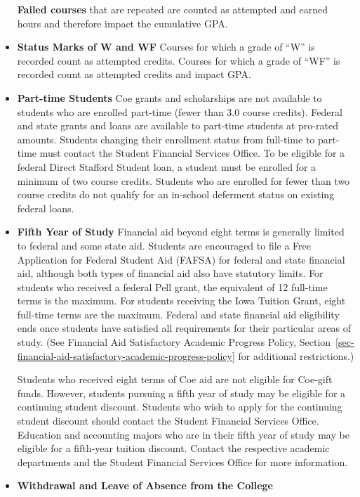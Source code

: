 \documentclass[
  letterpaper,
]{scrbook}
\begin{document}
\begin{itemize}
  \textbf{Failed courses} that are repeated are counted as attempted and
  earned hours and therefore impact the cumulative GPA.
\item
  \textbf{Status Marks of W and WF} Courses for which a grade of ``W''
  is recorded count as attempted credits. Courses for which a grade of
  ``WF'' is recorded count as attempted credits and impact GPA.
\item
  \textbf{Part-time Students} Coe grants and scholarships are not
  available to students who are enrolled part-time (fewer than 3.0
  course credits). Federal and state grants and loans are available to
  part-time students at pro-rated amounts. Students changing their
  enrollment status from full-time to part-time must contact the Student
  Financial Services Office. To be eligible for a federal Direct
  Stafford Student loan, a student must be enrolled for a minimum of two
  course credits. Students who are enrolled for fewer than two course
  credits do not qualify for an in-school deferment status on existing
  federal loans.
\item
  \textbf{Fifth Year of Study} Financial aid beyond eight terms is
  generally limited to federal and some state aid. Students are
  encouraged to file a Free Application for Federal Student Aid (FAFSA)
  for federal and state financial aid, although both types of financial
  aid also have statutory limits. For students who received a federal
  Pell grant, the equivalent of 12 full-time terms is the maximum. For
  students receiving the Iowa Tuition Grant, eight full-time terms are
  the maximum. Federal and state financial aid eligibility ends once
  students have satisfied all requirements for their particular areas of
  study. (See Financial Aid Satisfactory Academic Progress Policy,
  Section~\ref{sec-financial-aid-satisfactory-academic-progress-policy}
  for additional restrictions.)

  Students who received eight terms of Coe aid are not eligible for
  Coe-gift funds. However, students pursuing a fifth year of study may
  be eligible for a continuing student discount. Students who wish to
  apply for the continuing student discount should contact the Student
  Financial Services Office. Education and accounting majors who are in
  their fifth year of study may be eligible for a fifth-year tuition
  discount. Contact the respective academic departments and the Student
  Financial Services Office for more information.
\item
  \textbf{Withdrawal and Leave of Absence from the College}
\end{itemize}
\end{document}
